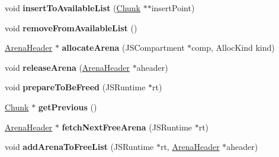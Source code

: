 \begin{DoxyCompactItemize}
\item 
\hypertarget{structjs_1_1gc_1_1_chunk_a50fe12e2ba5edec503da8e7ab7f3f84f}{void {\bfseries insert\-To\-Available\-List} (\hyperlink{structjs_1_1gc_1_1_chunk}{Chunk} $\ast$$\ast$insert\-Point)}\label{structjs_1_1gc_1_1_chunk_a50fe12e2ba5edec503da8e7ab7f3f84f}

\item 
\hypertarget{structjs_1_1gc_1_1_chunk_a9de4a54122a34684b08a7acb09b60c5c}{void {\bfseries remove\-From\-Available\-List} ()}\label{structjs_1_1gc_1_1_chunk_a9de4a54122a34684b08a7acb09b60c5c}

\item 
\hypertarget{structjs_1_1gc_1_1_chunk_a66a5c588bba958d2d78baa12cece5ef6}{\hyperlink{structjs_1_1gc_1_1_arena_header}{Arena\-Header} $\ast$ {\bfseries allocate\-Arena} (J\-S\-Compartment $\ast$comp, Alloc\-Kind kind)}\label{structjs_1_1gc_1_1_chunk_a66a5c588bba958d2d78baa12cece5ef6}

\item 
\hypertarget{structjs_1_1gc_1_1_chunk_a7af13b6666f438363137ac68f96cf361}{void {\bfseries release\-Arena} (\hyperlink{structjs_1_1gc_1_1_arena_header}{Arena\-Header} $\ast$aheader)}\label{structjs_1_1gc_1_1_chunk_a7af13b6666f438363137ac68f96cf361}

\item 
\hypertarget{structjs_1_1gc_1_1_chunk_a4a41b7b1dc9e8066d4490ce9a30b75c1}{void {\bfseries prepare\-To\-Be\-Freed} (J\-S\-Runtime $\ast$rt)}\label{structjs_1_1gc_1_1_chunk_a4a41b7b1dc9e8066d4490ce9a30b75c1}

\item 
\hypertarget{structjs_1_1gc_1_1_chunk_a5dbfba26018cab3e0abc61b0b3f46f3c}{\hyperlink{structjs_1_1gc_1_1_chunk}{Chunk} $\ast$ {\bfseries get\-Previous} ()}\label{structjs_1_1gc_1_1_chunk_a5dbfba26018cab3e0abc61b0b3f46f3c}

\item 
\hypertarget{structjs_1_1gc_1_1_chunk_aaec4f13dee8aa15d1c1c41eb6d999dbe}{\hyperlink{structjs_1_1gc_1_1_arena_header}{Arena\-Header} $\ast$ {\bfseries fetch\-Next\-Free\-Arena} (J\-S\-Runtime $\ast$rt)}\label{structjs_1_1gc_1_1_chunk_aaec4f13dee8aa15d1c1c41eb6d999dbe}

\item 
\hypertarget{structjs_1_1gc_1_1_chunk_a0ad58f1e12a1a04e9476dcfd1063e554}{void {\bfseries add\-Arena\-To\-Free\-List} (J\-S\-Runtime $\ast$rt, \hyperlink{structjs_1_1gc_1_1_arena_header}{Arena\-Header} $\ast$aheader)}\label{structjs_1_1gc_1_1_chunk_a0ad58f1e12a1a04e9476dcfd1063e554}

\end{DoxyCompactItemize}
